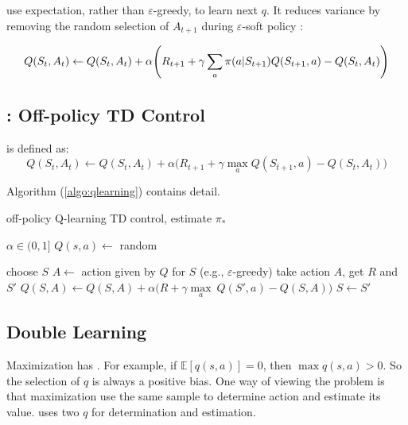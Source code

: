  use expectation, rather than $\varepsilon$-greedy, to learn next $q$. It reduces variance by removing the random selection of $A_{t+1}$ during $\varepsilon$-soft policy :

\begin{equation}
	Q(S_t,A_t) \gets Q(S_t,A_t) + \alpha \mleft ( R_{t+1} + \gamma \sum_a \pi(a|S_{t+1}) Q(S_{t+1},a) - Q(S_t,A_t) \mright )
\end{equation}


\subsection{: Off-policy TD Control}

 is defined as:
\begin{equation}
	Q(S_t,A_t) \gets Q(S_t,A_t) + \alpha \Big ( R_{t+1} + \gamma \max_a Q(S_{t+1},a) - Q(S_t,A_t) \Big )
\end{equation}



Algorithm (\ref{algo:qlearning}) contains detail.

\begin{algorithm}
	\caption{off-policy Q-learning TD control, estimate $\pi_*$}\label{algo:qlearning}	
	
	\begin{algorithmic}[1]
		\State $ \alpha \in (0,1]$
		\State $Q(s,a) \gets$ random
		
		\Statex
		
		\Loop
			\State choose $S$
			\Repeat
				\State $A \gets$ action given by $Q$ for $S$ (e.g., $\varepsilon$-greedy)
				\State take action $A$, get $R$ and $S'$
				\State $Q(S,A) \gets Q(S,A) + \alpha \Big ( R + \gamma \underset{a}{\max}\ Q(S',a) - Q(S,A) \Big )$
				\State $S \gets S'$
		\EndLoop		
	\end{algorithmic}
\end{algorithm}

\subsection{Double Learning}

Maximization has . For example, if $\mathbb{E}[q(s,a)] = 0$, then $\max q(s,a) > 0$. So the selection of $q$ is always a positive bias. One way of viewing the problem is that maximization use the same sample to determine action and estimate its value.  uses two $q$ for determination and estimation.


